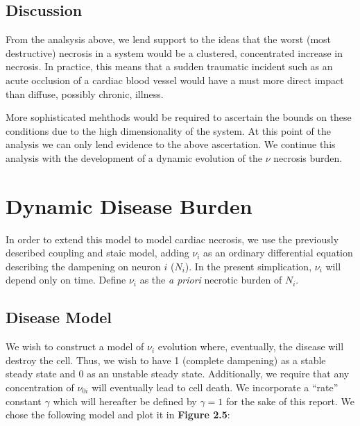 \documentclass[11pt]{report}
\begin{document}
\subsection{Discussion} %
\label{sub:discussion}

From the analsysis above, we lend support to the ideas that the worst (most destructive) necrosis in a system would be a clustered, concentrated increase in necrosis. In practice, this means that a sudden traumatic incident such as an acute occlusion of a cardiac blood vessel would have a must more direct impact than diffuse, possibly chronic, illness.

More sophisticated mehthods would be required to ascertain the bounds on these conditions due to the high dimensionality of the system. At this point of the analysis we can only lend evidence to the above ascertation. We continue this analysis with the development of a dynamic evolution of the $\nu$ necrosis burden. 



\section{Dynamic Disease Burden} %
\label{sub:dynamic_disease_burden}

In order to extend this model to model cardiac necrosis, we use the previously described coupling and staic model, adding $\nu_i$ as an ordinary differential equation describing the dampening on neuron $i$ ($N_i$). In the present simplication, $\nu_i$ will depend only on time. Define $\nu_{i}$ as the \textit{a priori} necrotic burden of $N_i$. 

\subsection{Disease Model} %
\label{sub:disease_model}


We wish to construct a model of $\nu_{i}$ evolution where, eventually, the disease will destroy the cell. Thus, we wish to have 1 (complete dampening) as a stable steady state and 0 as an unstable steady state. Additionally, we require that any concentration of $\nu_{0i}$ will eventually lead to cell death. We incorporate a ``rate'' constant $\gamma$ which will hereafter be defined by $\gamma = 1$ for the sake of this report. We chose the following model and plot it in \textbf{Figure 2.5}:
\end{document}
